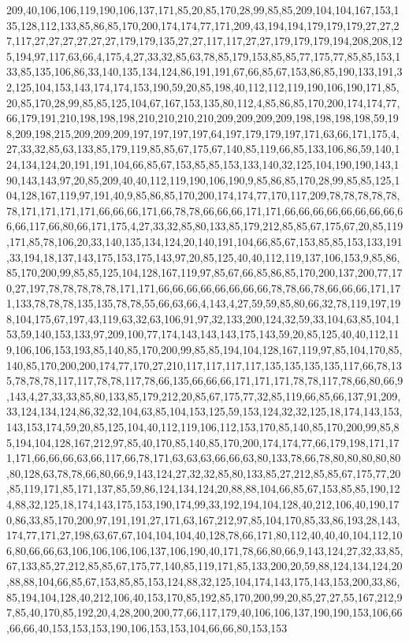 209,40,106,106,119,190,106,137,171,85,20,85,170,28,99,85,85,209,104,104,167,153,135,128,112,133,85,86,85,170,200,174,174,77,171,209,43,194,194,179,179,179,27,27,27,117,27,27,27,27,27,27,179,179,135,27,27,117,117,27,27,179,179,179,194,208,208,125,194,97,117,63,66,4,175,4,27,33,32,85,63,78,85,179,153,85,85,77,175,77,85,85,153,133,85,135,106,86,33,140,135,134,124,86,191,191,67,66,85,67,153,86,85,190,133,191,32,125,104,153,143,174,174,153,190,59,20,85,198,40,112,112,119,190,106,190,171,85,20,85,170,28,99,85,85,125,104,67,167,153,135,80,112,4,85,86,85,170,200,174,174,77,66,179,191,210,198,198,198,210,210,210,210,209,209,209,209,198,198,198,198,59,198,209,198,215,209,209,209,197,197,197,197,64,197,179,179,197,171,63,66,171,175,4,27,33,32,85,63,133,85,179,119,85,85,67,175,67,140,85,119,66,85,133,106,86,59,140,124,134,124,20,191,191,104,66,85,67,153,85,85,153,133,140,32,125,104,190,190,143,190,143,143,97,20,85,209,40,40,112,119,190,106,190,9,85,86,85,170,28,99,85,85,125,104,128,167,119,97,191,40,9,85,86,85,170,200,174,174,77,170,117,209,78,78,78,78,78,78,171,171,171,171,66,66,66,171,66,78,78,66,66,66,171,171,66,66,66,66,66,66,66,66,66,66,117,66,80,66,171,175,4,27,33,32,85,80,133,85,179,212,85,85,67,175,67,20,85,119,171,85,78,106,20,33,140,135,134,124,20,140,191,104,66,85,67,153,85,85,153,133,191,33,194,18,137,143,175,153,175,143,97,20,85,125,40,40,112,119,137,106,153,9,85,86,85,170,200,99,85,85,125,104,128,167,119,97,85,67,66,85,86,85,170,200,137,200,77,170,27,197,78,78,78,78,78,171,171,66,66,66,66,66,66,66,66,78,78,66,78,66,66,66,171,171,133,78,78,78,135,135,78,78,55,66,63,66,4,143,4,27,59,59,85,80,66,32,78,119,197,198,104,175,67,197,43,119,63,32,63,106,91,97,32,133,200,124,32,59,33,104,63,85,104,153,59,140,153,133,97,209,100,77,174,143,143,143,175,143,59,20,85,125,40,40,112,119,106,106,153,193,85,140,85,170,200,99,85,85,194,104,128,167,119,97,85,104,170,85,140,85,170,200,200,174,77,170,27,210,117,117,117,117,135,135,135,135,117,66,78,135,78,78,78,117,117,78,78,117,78,66,135,66,66,66,171,171,171,78,78,117,78,66,80,66,9,143,4,27,33,33,85,80,133,85,179,212,20,85,67,175,77,32,85,119,66,85,66,137,91,209,33,124,134,124,86,32,32,104,63,85,104,153,125,59,153,124,32,32,125,18,174,143,153,143,153,174,59,20,85,125,104,40,112,119,106,112,153,170,85,140,85,170,200,99,85,85,194,104,128,167,212,97,85,40,170,85,140,85,170,200,174,174,77,66,179,198,171,171,171,66,66,66,63,66,117,66,78,171,63,63,63,66,66,63,80,133,78,66,78,80,80,80,80,80,80,128,63,78,78,66,80,66,9,143,124,27,32,32,85,80,133,85,27,212,85,85,67,175,77,20,85,119,171,85,171,137,85,59,86,124,134,124,20,88,88,104,66,85,67,153,85,85,190,124,88,32,125,18,174,143,175,153,190,174,99,33,192,194,104,128,40,212,106,40,190,170,86,33,85,170,200,97,191,191,27,171,63,167,212,97,85,104,170,85,33,86,193,28,143,174,77,171,27,198,63,67,67,104,104,104,40,128,78,66,171,80,112,40,40,40,104,112,106,80,66,66,63,106,106,106,106,137,106,190,40,171,78,66,80,66,9,143,124,27,32,33,85,67,133,85,27,212,85,85,67,175,77,140,85,119,171,85,133,200,20,59,88,124,134,124,20,88,88,104,66,85,67,153,85,85,153,124,88,32,125,104,174,143,175,143,153,200,33,86,85,194,104,128,40,212,106,40,153,170,85,192,85,170,200,99,20,85,27,27,55,167,212,97,85,40,170,85,192,20,4,28,200,200,77,66,117,179,40,106,106,137,190,190,153,106,66,66,66,40,153,153,153,190,106,153,153,104,66,66,80,153,153